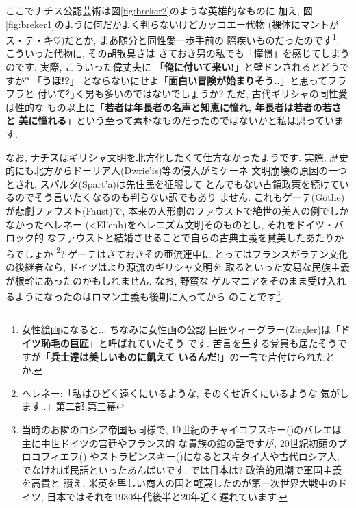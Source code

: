 \documentclass[b5j,8pt,twocolumn]{ltjsarticle}
\newcommand{\textgreek}[1]{\begingroup\fontencoding{LGR}\selectfont#1\endgroup}
\newcommand{\textgreek}[1]{\begingroup\fontencoding{LGR}\selectfont#1\endgroup}
\begin{document}
ここでナチス公認芸術は図\ref{fig:breker2}のような英雄的なものに
加え, 図\ref{fig:breker1}のように何だかよく判らないけどカッコエー代物
(裸体にマントがス・テ・キ$\heartsuit$)だとか, まあ随分と同性愛一歩手前の
際疾いものだったのです\footnote{女性絵画になると... ちなみに女性画の公認
巨匠ツィーグラー(Ziegler)は「\textbf{ドイツ恥毛の巨匠}」と呼ばれていたそう
です. 苦言を呈する党員も居たそうですが「\textbf{兵士達は美しいものに飢えて
いるんだ!}」の一言で片付けられたとか.}. こういった代物に, その胡散臭さは
さておき男の私でも「憧憬」を感じてしまうのです. 実際, こういった偉丈夫に
「\textbf{俺に付いて来い!}」と壁ドンされるとどうですか? 「\textbf{うほ!?}」
とならないにせよ「\textbf{面白い冒険が始まりそう..}」と思ってフラフラと
付いて行く男も多いのではないでしょうか? ただ, 古代ギリシャの同性愛は性的な
もの以上に「\textbf{若者は年長者の名声と知恵に憧れ, 年長者は若者の若さと
美に憧れる}」という至って素朴なものだったのではないかと私は思っています.
\newline

なお, ナチスはギリシャ文明を北方化したくて仕方なかったようです.
 実際, 歴史的にも北方からドーリア人(\textgreek{Dwrie'is})等の侵入がミケーネ
文明崩壊の原因の一つとされ, スパルタ(\textgreek{Spart'a})は先住民を征服して
とんでもない占領政策を続けているのでそう言いたくなるのも判らない訳でもあり
ません. これもゲーテ(G\"othe)が悲劇ファウスト(Faust)\cite{ゲーテ}で,
 本来の人形劇のファウストで絶世の美人の例でしかなかったヘレネー
(\textgreek{<El'enh})をヘレニズム文明そのものとし, それをドイツ・バロック的
なファウストと結婚させることで自らの古典主義を賛美したあたりからでしょか
\footnote{ヘレネー:「私はひどく遠くにいるような, そのくせ近くにいるような
気がします..」\cite{ゲーテ}第二部,第三幕}?  ゲーテはさておきその亜流連中に
とってはフランスがラテン文化の後継者なら, ドイツはより源流のギリシャ文明を
取るといった安易な民族主義が根幹にあったのかもしれません. なお, 野蛮な
ゲルマニアをそのまま受け入れるようになったのはロマン主義も後期に入ってから
のことです\footnote{当時のお隣のロシア帝国も同様で, 19世紀のチャイコフスキー({})のバレエは主に中世ドイツの宮廷やフランス的
な貴族の館の話ですが, 20世紀初頭のプロコフィエフ({})
やストラビンスキー({})になるとスキタイ人や古代ロシア人,
 でなければ民話といったあんばいです. では日本は? 政治的風潮で軍国主義を高貴と
讃え, 米英を卑しい商人の国と軽蔑したのが第一次世界大戦中のドイツ\cite{クラウス},
 日本ではそれを1930年代後半と20年近く遅れています.}.
\newline
\end{document}
